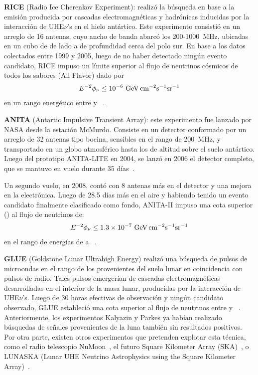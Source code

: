 	\textbf{RICE} (Radio Ice Cherenkov Experiment): realiz\'o la b\'usqueda en base a la emisi\'on producida por cascadas electromagn\'eticas y hadr\'onicas inducidas por la interacci\'on de UHE$\nu$'s en el hielo ant\'artico.
	Este experimento consisti\'o en un arreglo de 16 antenas, cuyo ancho de banda abarc\'o los 200-1000~MHz, ubicadas en un cubo de  de lado a  de profundidad cerca del polo sur.
	En base a los datos colectados entre 1999 y 2005, luego de no haber detectado ning\'un evento candidato,
RICE impuso un l\'imite superior al flujo de neutrinos c\'osmicos de todos los sabores (All Flavor) dado por
	\begin{equation}
	 E^{-2}\phi_\nu \leq 10^{-6}{\rm\ GeV\,cm^{-2}s^{-1}sr^{-1}}
	\end{equation}
	en un rango energ\'etico entre  y ~\cite{cite:RICE}.
	 
	\textbf{ANITA} (Antartic Impulsive Transient Array): este experimento fue lanzado por NASA desde la estaci\'on McMurdo. 
	Consiste en un detector conformado por un arreglo de 32 antenas tipo bocina, sensibles en el rango de 200~MHz, y transportado en un globo atmosf\'erico hasta los  de altitud sobre el suelo ant\'artico.
	Luego del prototipo ANITA-LITE en 2004, se lanzó en 2006 el detector completo, que se mantuvo en vuelo durante 35 d\'ias~\cite{cite:Anita1}.
	 
	Un segundo vuelo, en 2008, cont\'o con 8 antenas m\'as en el detector y una mejora en la electr\'onica.
	Luego de 28.5 d\'ias m\'as en el aire y habiendo tenido un evento candidato finalmente clasificado como fondo, ANITA-II impuso una cota superior () al flujo de neutrinos de:
	\begin{equation}
	 E^{-2}\phi_\nu \leq 1.3\times10^{-7}{\rm\ GeV\,cm^{-2}s^{-1}sr^{-1}}
	\end{equation}
	en el rango de energ\'ias de  a ~\cite{cite:Anita2}.
	
	\textbf{GLUE} (Goldstone Lunar Ultrahigh Energy) realiz\'o una b\'usqueda de pulsos de microondas en el rango de los  provenientes del suelo lunar en coincidencia con pulsos de radio. 
	Tales pulsos emerger\'ian de cascadas electromagn\'eticas desarrolladas en el interior de la masa lunar, producidas por la interacci\'on de UHE$\nu$'s. 
	Luego de 30 horas efectivas de observaci\'on y ningún candidato observado, GLUE estableci\'o una cota superior al flujo de neutrinos entre  y ~\cite{cite:Glue}.
	Anteriormente, los experimentos Kalyazin \cite{cite:Kalazin} y Parkes \cite{cite:Parkes} ya hab\'ian realizado b\'usquedas de se\~nales provenientes de la luna tambi\'en sin resultados positivos.
	Por otra parte, existen otros experimentos que pretenden explotar esta t\'ecnica, como el radio telescopio NuMoon~\cite{cite:NuMoon}, el futuro Square Kilometer Array (SKA)~\cite{cite:SKA}, o LUNASKA (Lunar UHE Neutrino Astrophysics using the Square Kilometer Array)~\cite{cite:LUNASKA}.
	
